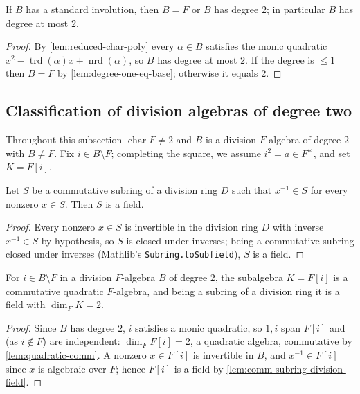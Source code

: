 \begin{lemma}
    \label{lem:standard-involution-degree-two}
    If $B$ has a standard involution, then $B = F$ or $B$ has degree $2$; in
    particular $B$ has degree at most $2$.
\end{lemma}
\begin{proof}
    By \ref{lem:reduced-char-poly} every $\alpha \in B$ satisfies the monic
    quadratic $x^2 - \operatorname{trd}(\alpha)x + \operatorname{nrd}(\alpha)$, so
    $B$ has degree at most $2$. If the degree is $\leq 1$ then $B = F$ by
    \ref{lem:degree-one-eq-base}; otherwise it equals $2$.
\end{proof}

\subsection{Classification of division algebras of degree two}

Throughout this subsection $\operatorname{char} F \neq 2$ and $B$ is a division
$F$-algebra of degree $2$ with $B \neq F$. Fix $i \in B \setminus F$; completing
the square, we assume $i^2 = a \in F^\times$, and set $K = F[i]$.

\begin{lemma}
    \label{lem:comm-subring-division-field}
    Let $S$ be a commutative subring of a division ring $D$ such that $x^{-1} \in S$
    for every nonzero $x \in S$. Then $S$ is a field.
\end{lemma}
\begin{proof}
    Every nonzero $x \in S$ is invertible in the division ring $D$ with inverse
    $x^{-1} \in S$ by hypothesis, so $S$ is closed under inverses; being a
    commutative subring closed under inverses (Mathlib's
    \texttt{Subring.toSubfield}), $S$ is a field.
\end{proof}

\begin{lemma}
    \label{lem:quadratic-subfield}
    For $i \in B \setminus F$ in a division $F$-algebra $B$ of degree $2$, the
    subalgebra $K = F[i]$ is a commutative quadratic $F$-algebra, and being a
    subring of a division ring it is a field with $\dim_F K = 2$.
\end{lemma}
\begin{proof}
    Since $B$ has degree $2$, $i$ satisfies a monic quadratic, so $1, i$ span
    $F[i]$ and (as $i \notin F$) are independent: $\dim_F F[i] = 2$, a quadratic
    algebra, commutative by \ref{lem:quadratic-comm}. A nonzero $x \in F[i]$ is
    invertible in $B$, and $x^{-1} \in F[i]$ since $x$ is algebraic over $F$; hence
    $F[i]$ is a field by \ref{lem:comm-subring-division-field}.
\end{proof}

